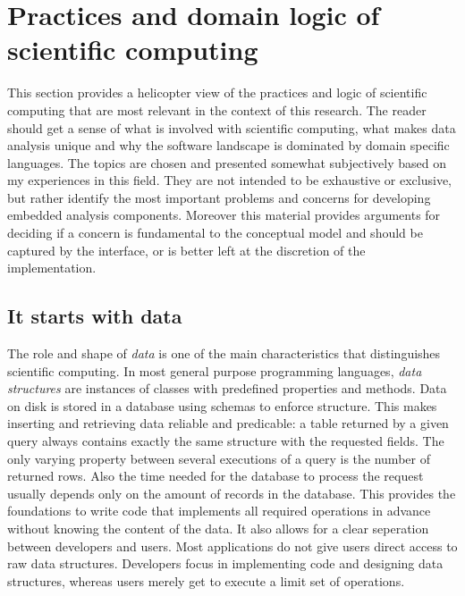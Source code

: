 
\section{Practices and domain logic of scientific computing}


This section provides a helicopter view of the practices and logic of scientific computing that are most relevant in the context of this research. The reader should get a sense of what is involved with scientific computing, what makes data analysis unique and why the software landscape is dominated by domain specific languages. The topics are chosen and presented somewhat subjectively based on my experiences in this field. They are not intended to be exhaustive or exclusive, but rather identify the most important problems and concerns for developing embedded analysis components. Moreover this material provides arguments for deciding if a concern is fundamental to the conceptual model and should be captured by the interface, or is better left at the discretion of the implementation.

\subsection{It starts with data}

The role and shape of \emph{data} is one of the main characteristics that distinguishes scientific computing. In most general purpose programming languages, \emph{data structures} are instances of classes with predefined properties and methods. Data on disk is stored in a database using schemas to enforce structure. This makes inserting and retrieving data reliable and predicable: a table returned by a given \SQL query always contains exactly the same structure with the requested fields. The only varying property between several executions of a query is the number of returned rows. Also the time needed for the database to process the request usually depends only on the amount of records in the database. This provides the foundations to write code that implements all required operations in advance without knowing the content of the data. It also allows for a clear seperation between developers and users. Most applications do not give users direct access to raw data structures. Developers focus in implementing code and designing data structures, whereas users merely get to execute a limit set of operations.


